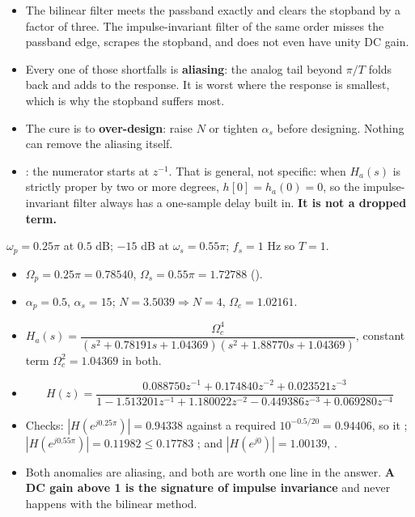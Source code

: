 \begin{itemize}
  \item {} The
        bilinear filter meets the passband exactly and clears the stopband by a factor
        of three. The impulse-invariant filter of the same order misses the passband
        edge, scrapes the stopband, and does not even have unity DC gain.
  \item Every one of those shortfalls is \textbf{aliasing}: the analog tail beyond
        $\pi/T$ folds back and adds to the response. It is worst where the response is
        smallest, which is why the stopband suffers most.
  \item The cure is to \textbf{over-design}: raise $N$ or tighten $\alpha_s$ before
        designing. Nothing can remove the aliasing itself.
  \item {}: the numerator starts at $z^{-1}$. That is general, not
        specific: when $H_a(s)$ is strictly proper by two or more degrees,
        $h[0]=h_a(0)=0$, so the impulse-invariant filter always has a one-sample delay
        built in. \textbf{It is not a dropped term.}
\end{itemize}

{\color{sub}\footnotesize $\omega_p=0.25\pi$ at $0.5$ dB; $-15$ dB at $\omega_s=0.55\pi$;
$f_s=1$ Hz so $T=1$.}
\begin{itemize}
  \item $\Omega_p=0.25\pi=0.78540$, $\Omega_s=0.55\pi=1.72788$ ().
  \item $\alpha_p=0.5$, $\alpha_s=15$; $N=3.5039\Rightarrow\boxed{N=4}$,
        $\Omega_c=1.02161$.
  \item $H_a(s)=\dfrac{\Omega_c^4}{(s^2+0.78191s+1.04369)(s^2+1.88770s+1.04369)}$,
        constant term $\Omega_c^2=1.04369$ in both.
  \item[] \[ H(z)=\frac{0.088750z^{-1}+0.174840z^{-2}+0.023521z^{-3}}
             {1-1.513201z^{-1}+1.180022z^{-2}-0.449386z^{-3}+0.069280z^{-4}} \]
  \item Checks: $|H(e^{j0.25\pi})|=0.94338$ against a required $10^{-0.5/20}=0.94406$,
        so it ; $|H(e^{j0.55\pi})|=0.11982\le0.17783$
        \checkmark; and $|H(e^{j0})|=1.00139$, .
  \item Both anomalies are aliasing, and both are worth one line in the answer.
        \textbf{A DC gain above 1 is the signature of impulse invariance} and never
        happens with the bilinear method.
\end{itemize}

